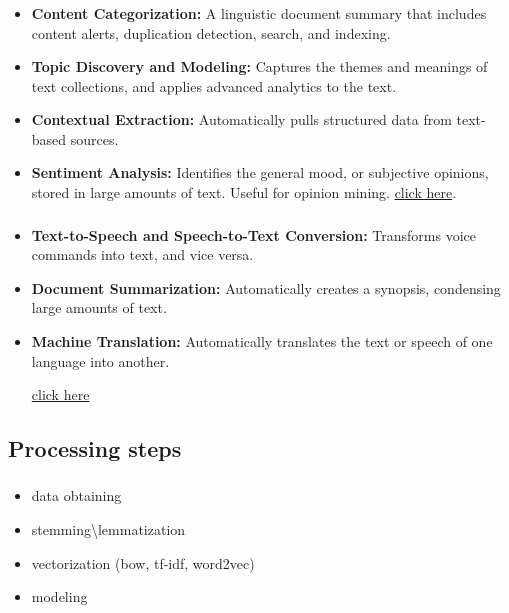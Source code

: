 \documentclass[t, 11pt]{beamer}
\begin{document}
	\begin{frame}
		\frametitle{\insertsection}
		\frametitle{\insertsubsection}  
	\begin{itemize}
    \item \textbf{Content Categorization:} A linguistic document summary that includes content alerts, duplication detection, search, and indexing.
	\item \textbf{Topic Discovery and Modeling:} Captures the themes and meanings of text collections, and applies advanced analytics to the text.
	\item \textbf{Contextual Extraction:} Automatically pulls structured data from text-based sources.
	\item \textbf{Sentiment Analysis:} Identifies the general mood, or subjective opinions, stored in large amounts of text. Useful for opinion mining.
	\vspace{1cm}
 	\href{https://www.dataversity.net/a-brief-history-of-natural-language-processing-nlp/}{click here}.
 \end{itemize}
	\end{frame}

	\begin{frame}
	\frametitle{\insertsection}
	\frametitle{\insertsubsection}  
	\begin{itemize}

		\item \textbf{Text-to-Speech and Speech-to-Text Conversion:} Transforms voice commands into text, and vice versa.
		\item \textbf{Document Summarization:} Automatically creates a synopsis, condensing large amounts of text.
		\item \textbf{Machine Translation:} Automatically translates the text or speech of one language into another.
		
		\vspace{1cm}
		\href{https://www.dataversity.net/a-brief-history-of-natural-language-processing-nlp/}{click here}
	\end{itemize}
\end{frame}


	\subsection{Processing steps}

\begin{frame}\label{steps}
	\frametitle{\insertsection}
	\frametitle{\insertsubsection}
	\begin{itemize}
		\item data obtaining 
		\item stemming\textbackslash lemmatization
		\item vectorization (bow, tf-idf, word2vec) 
		\item modeling 
	\end{itemize}
\end{frame}
\end{document}
